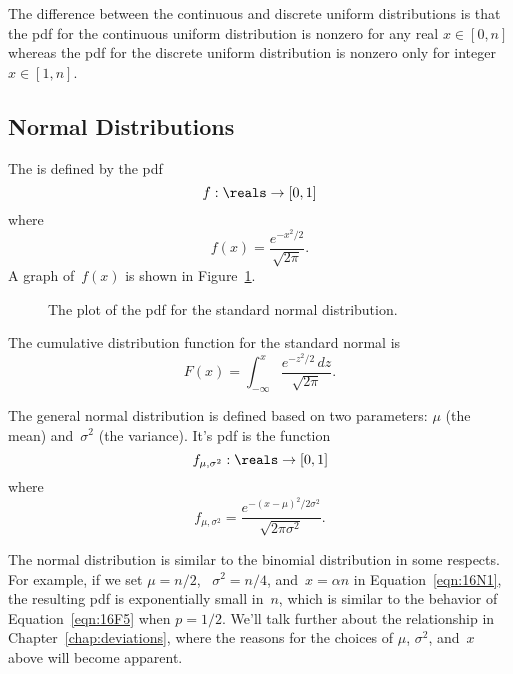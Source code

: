 The difference between the continuous and discrete uniform
distributions is that the pdf for the continuous uniform distribution
is nonzero for any real $x \in [0, n]$ whereas the pdf for the
discrete uniform distribution is nonzero only for integer~$x \in [1,
  n]$.

\subsection{Normal Distributions}

The  is defined by the pdf
\begin{equation*}
    f: \reals \to [0, 1]
\end{equation*}
where
\begin{equation*}
    f(x) = \frac{ e^{-x^2/2} }{ \sqrt{2\pi} }.
\end{equation*}
A graph of~$f(x)$ is shown in Figure~\ref{fig:16L1}.

\begin{figure}



\caption{The plot of the pdf for the standard normal distribution.}

\label{fig:16L1}

\end{figure}

The cumulative distribution function for the standard normal is
\begin{equation*}
    F(x) = \int_{-\infty}^x \frac{ e^{-z^2/2} \, dz }{\sqrt{2\pi}}.
\end{equation*}

The general normal distribution is defined based on two parameters:
$\mu$ (the mean) and~$\sigma^2$ (the variance).  It's pdf is the
function
\begin{equation*}
    f_{\mu, \sigma^2} : \reals \to [0, 1]
\end{equation*}
where
\begin{equation}\label{eqn:16N1}
    f_{\mu, \sigma^2} = \frac{ e^{ - (x - \mu)^2 / 2 \sigma^2 } }
                             { \sqrt{2 \pi \sigma^2 } }.
\end{equation}

The normal distribution is similar to the binomial distribution in
some respects.  For example, if we set $\mu = n/2$, \ $\sigma^2 =
n/4$, and~$x = \alpha n$ in Equation~\ref{eqn:16N1}, the resulting pdf
is exponentially small in~$n$, which is similar to the behavior of
Equation~\ref{eqn:16F5} when $p = 1/2$.  We'll talk further about the
relationship in Chapter~\ref{chap:deviations}, where the reasons for
the choices of $\mu$, $\sigma^2$, and~$x$ above will become apparent.

\endinput
